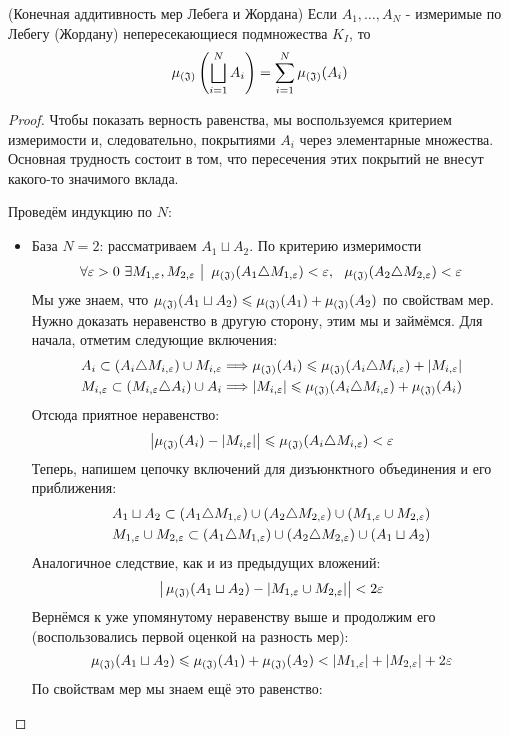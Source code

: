 \begin{theorem} (Конечная аддитивность мер Лебега и Жордана)
	Если $A_1, \ldots, A_N$ - измеримые по Лебегу (Жордану) непересекающиеся подмножества $K_I$, то 
	\[
		\operatorname{\mu_{(\mathfrak{J})}} \left(\bigsqcup_{i = 1}^N A_i\right) = \sum_{i = 1}^N \operatorname{\mu_{(\mathfrak{J})}}(A_i)
	\]
\end{theorem}

\begin{proof}
	Чтобы показать верность равенства, мы воспользуемся критерием измеримости и, следовательно, покрытиями $A_i$ через элементарные множества. Основная трудность состоит в том, что пересечения этих покрытий не внесут какого-то значимого вклада.
	
	Проведём индукцию по $N$:
	\begin{itemize}
		\item База $N = 2$: рассматриваем $A_1 \sqcup A_2$. По критерию измеримости
		\[
			\forall \varepsilon > 0\ \exists M_{1, \varepsilon}, M_{2, \varepsilon} \ \big|\  \operatorname{\mu_{(\mathfrak{J})}}(A_1 \triangle M_{1, \varepsilon}) < \varepsilon,\ \ \operatorname{\mu_{(\mathfrak{J})}}(A_2 \triangle M_{2, \varepsilon}) < \varepsilon
		\]
		Мы уже знаем, что $\operatorname{\mu_{(\mathfrak{J})}}(A_1 \sqcup A_2) \leqslant \operatorname{\mu_{(\mathfrak{J})}}(A_1) + \operatorname{\mu_{(\mathfrak{J})}}(A_2)$ по свойствам мер. Нужно доказать неравенство в другую сторону, этим мы и займёмся. Для начала, отметим следующие включения:
		\begin{align*}
			&{A_i \subset (A_i \triangle M_{i, \varepsilon}) \cup M_{i, \varepsilon} \Longrightarrow \operatorname{\mu_{(\mathfrak{J})}}(A_i) \leqslant \operatorname{\mu_{(\mathfrak{J})}}(A_i \triangle M_{i, \varepsilon}) + |M_{i, \varepsilon}|}
			\\
			&{M_{i, \varepsilon} \subset (M_{i, \varepsilon} \triangle A_i) \cup A_i \Longrightarrow |M_{i, \varepsilon}| \leqslant \operatorname{\mu_{(\mathfrak{J})}}(A_i \triangle M_{i, \varepsilon}) + \operatorname{\mu_{(\mathfrak{J})}}(A_i)}
		\end{align*}
		Отсюда приятное неравенство:
		\[
			\left|\operatorname{\mu_{(\mathfrak{J})}}(A_i) - |M_{i, \varepsilon}|\right| \leqslant \operatorname{\mu_{(\mathfrak{J})}}(A_i \triangle M_{i, \varepsilon}) < \varepsilon
		\]
		Теперь, напишем цепочку включений для дизъюнктного объединения и его приближения:
		\begin{align*}
			&{A_1 \sqcup A_2 \subset (A_1 \triangle M_{1, \varepsilon}) \cup (A_2 \triangle M_{2, \varepsilon}) \cup (M_{1, \varepsilon} \cup M_{2, \varepsilon})}
			\\
			&{M_{1, \varepsilon} \cup M_{2, \varepsilon} \subset (A_1 \triangle M_{1, \varepsilon}) \cup (A_2 \triangle M_{2, \varepsilon}) \cup (A_1 \sqcup A_2)}
		\end{align*}
		Аналогичное следствие, как и из предыдущих вложений:
		\[
			\big|\operatorname{\mu_{(\mathfrak{J})}}(A_1 \sqcup A_2) - |M_{1, \varepsilon} \cup M_{2, \varepsilon}|\big| < 2\varepsilon
		\]
		Вернёмся к уже упомянутому неравенству выше и продолжим его (воспользовались первой оценкой на разность мер):
		\[
			\operatorname{\mu_{(\mathfrak{J})}}(A_1 \sqcup A_2) \leqslant \operatorname{\mu_{(\mathfrak{J})}}(A_1) + \operatorname{\mu_{(\mathfrak{J})}}(A_2) < |M_{1, \varepsilon}| + |M_{2, \varepsilon}| + 2\varepsilon
		\]
		По свойствам мер мы знаем ещё это равенство:

\end{itemize}
\end{proof}
